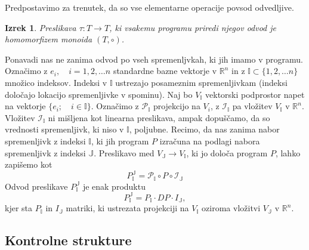 \documentclass{article}
\newcommand{\RR}{\mathbb{R}}
\newcommand{\II}{\mathbb{I}}
\newcommand{\JJ}{\mathbb{J}}
\newtheorem{izrek}{Izrek}[section]
\begin{document}
Predpostavimo za trenutek, da so vse elementarne operacije povsod odvedljive. 

\begin{izrek}
  Preslikava $\tau:T\to T$, ki vsakemu programu priredi njegov odvod je
  homomorfizem monoida $(T,\circ)$. 
\end{izrek}
Ponavadi nas ne zanima odvod po vseh spremenljvkah, ki jih imamo v programu.
Označimo z $e_i,\quad i=1,2,\ldots n$ standardne bazne vektorje v $\RR^n$ in z
$\II\subset\{1,2,\ldots n\}$ množico indeksov. Indeksi v $\II$ ustrezajo
posameznim spremenljivkam (indeksi določajo lokacijo spremenljivke v spominu). Naj bo $V_\II$ vektorski
podprostor napet na vektorje $\{e_i;\quad i\in\II\}$. Označimo z 
$\mathcal{P}_\II$ projekcijo na $V_i$, z $\mathcal{I}_\II$ pa vložitev $V_\II$ v
$\RR^n$. Vložitev $\mathcal{I}_\II$ ni mišljena kot linearna preslikava, ampak
dopuščamo, da so vrednosti spremenljivk, ki niso v $\II$, poljubne. Recimo, da nas zanima nabor spremenljivk z indeksi $\II$, ki jih
program $P$ izračuna na podlagi nabora spremenljivk z indeksi $\mathbb{J}$.
Preslikavo med $V_\JJ\to V_\II$, ki jo določa program $P$, lahko zapišemo kot
\begin{equation}
  \label{eq:zozitev}
  P^{\JJ}_{\II}=\mathcal{P}_\II\circ P\circ \mathcal{I}_\JJ 
\end{equation}
Odvod preslikave $ P^{\JJ}_{\II}$ je enak produktu
\begin{equation*}
  P^{\JJ}_{\II}=P_\II\cdot DP\cdot I_\JJ,   
\end{equation*}
kjer sta $P_\II$ in  $I_\JJ$ matriki, ki ustrezata projekciji na $V_\II$ oziroma
vložitvi $V_\JJ$ v $\RR^n$.

\subsection{Kontrolne strukture}
\end{document}
